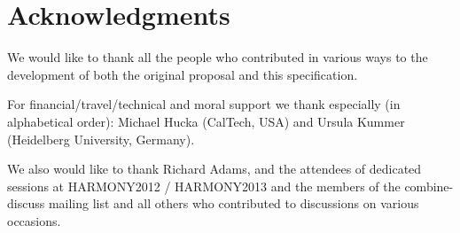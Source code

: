 
\section{Acknowledgments}
 We would like to thank all the people who contributed in various ways 
to the development of both the original proposal and this specification. 

For financial/travel/technical and moral support we thank especially (in 
alphabetical order): Michael Hucka (CalTech, USA) and Ursula Kummer 
(Heidelberg University, Germany). 

We also would like to thank Richard Adams, and the attendees of dedicated 
sessions at HARMONY2012 / HARMONY2013 and the members of the 
\textsf{combine-discuss} mailing list and all others who contributed to 
discussions on various occasions. 

